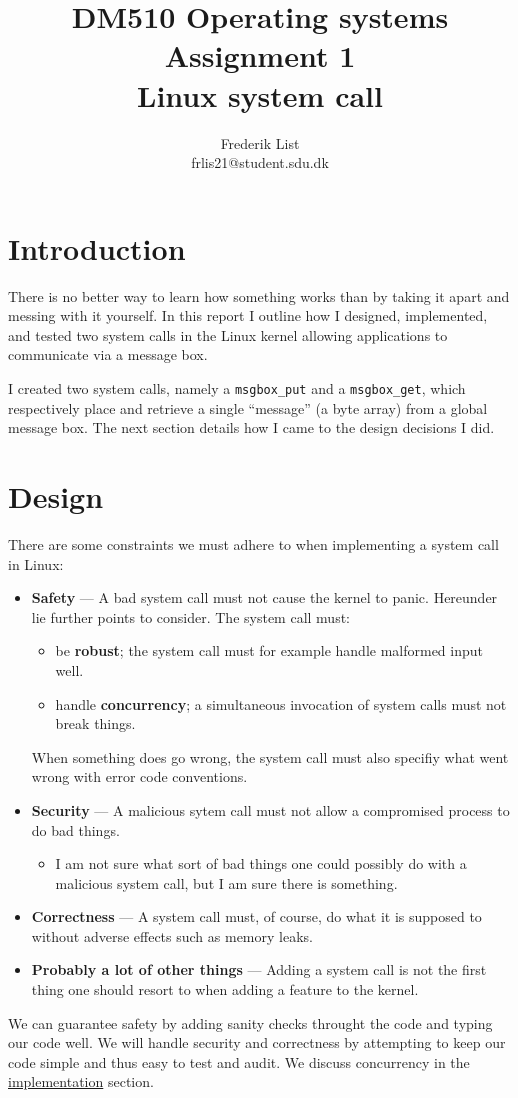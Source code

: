 \documentclass{report}
\title{
	DM510 Operating systems \\
	Assignment 1 \\
	\normalsize Linux system call
}
\author{
	Frederik List \\
	\small frlis21@student.sdu.dk
}
\begin{document}
\maketitle

\section*{Introduction}

There is no better way to learn how something works than by taking it apart and messing with it yourself. In this report I outline how I designed, implemented, and tested two system calls in the Linux kernel allowing applications to communicate via a message box.

I created two system calls, namely a \texttt{msgbox\_put} and a \texttt{msgbox\_get}, which respectively place and retrieve a single ``message'' (a byte array) from a global message box. The next section details how I came to the design decisions I did.

\section*{Design}
\label{sec:design}

There are some constraints we must adhere to when implementing a system call in Linux:%
%
\begin{itemize}%
	\item \textbf{Safety} --- A bad system call must not cause the kernel to panic. Hereunder lie further points to consider. The system call must:
	      \begin{itemize}
		      \item be \textbf{robust}; the system call must for example handle malformed input well.
		      \item handle \textbf{concurrency}; a simultaneous invocation of system calls must not break things.
	      \end{itemize}
	      When something does go wrong, the system call must also specifiy what went wrong with error code conventions.
	\item \textbf{Security} --- A malicious sytem call must not allow a compromised process to do bad things.
	      \begin{itemize}
		      \item I am not sure what sort of bad things one could possibly do with a malicious system call, but I am sure there is something.
	      \end{itemize}
	\item \textbf{Correctness} --- A system call must, of course, do what it is supposed to without adverse effects such as memory leaks.
	\item \textbf{Probably a lot of other things} --- Adding a system call is not the first thing one should resort to when adding a feature to the kernel.
\end{itemize}%
%
We can guarantee safety by adding sanity checks throught the code and typing our code well. We will handle security and correctness by attempting to keep our code simple and thus easy to test and audit. We discuss concurrency in the \hyperref[sec:impl]{implementation} section.
\end{document}

